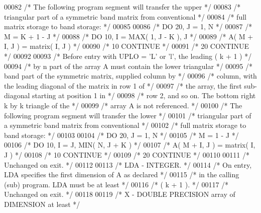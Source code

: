 \begin{DoxyCode}
00082 \textcolor{comment}{/*           The following program segment will transfer the upper */}
00083 \textcolor{comment}{/*           triangular part of a symmetric band matrix from conventional */}
00084 \textcolor{comment}{/*           full matrix storage to band storage: */}
00085 
00086 \textcolor{comment}{/*                 DO 20, J = 1, N */}
00087 \textcolor{comment}{/*                    M = K + 1 - J */}
00088 \textcolor{comment}{/*                    DO 10, I = MAX( 1, J - K ), J */}
00089 \textcolor{comment}{/*                       A( M + I, J ) = matrix( I, J ) */}
00090 \textcolor{comment}{/*              10    CONTINUE */}
00091 \textcolor{comment}{/*              20 CONTINUE */}
00092 
00093 \textcolor{comment}{/*           Before entry with UPLO = 'L' or 'l', the leading ( k + 1 ) */}
00094 \textcolor{comment}{/*           by n part of the array A must contain the lower triangular */}
00095 \textcolor{comment}{/*           band part of the symmetric matrix, supplied column by */}
00096 \textcolor{comment}{/*           column, with the leading diagonal of the matrix in row 1 of */}
00097 \textcolor{comment}{/*           the array, the first sub-diagonal starting at position 1 in */}
00098 \textcolor{comment}{/*           row 2, and so on. The bottom right k by k triangle of the */}
00099 \textcolor{comment}{/*           array A is not referenced. */}
00100 \textcolor{comment}{/*           The following program segment will transfer the lower */}
00101 \textcolor{comment}{/*           triangular part of a symmetric band matrix from conventional */}
00102 \textcolor{comment}{/*           full matrix storage to band storage: */}
00103 
00104 \textcolor{comment}{/*                 DO 20, J = 1, N */}
00105 \textcolor{comment}{/*                    M = 1 - J */}
00106 \textcolor{comment}{/*                    DO 10, I = J, MIN( N, J + K ) */}
00107 \textcolor{comment}{/*                       A( M + I, J ) = matrix( I, J ) */}
00108 \textcolor{comment}{/*              10    CONTINUE */}
00109 \textcolor{comment}{/*              20 CONTINUE */}
00110 
00111 \textcolor{comment}{/*           Unchanged on exit. */}
00112 
00113 \textcolor{comment}{/*  LDA    - INTEGER. */}
00114 \textcolor{comment}{/*           On entry, LDA specifies the first dimension of A as declared */}
00115 \textcolor{comment}{/*           in the calling (sub) program. LDA must be at least */}
00116 \textcolor{comment}{/*           ( k + 1 ). */}
00117 \textcolor{comment}{/*           Unchanged on exit. */}
00118 
00119 \textcolor{comment}{/*  X      - DOUBLE PRECISION array of DIMENSION at least */}

\end{DoxyCode}
